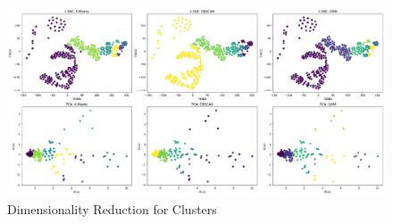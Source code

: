\documentclass[english]{article}
\begin{document}
\vspace{1cm}

\begin{figure}[h]
    \centering
    \includegraphics[width=1\textwidth]{img/dimensionality_reduction.png}
        \vspace{-2mm}
    \caption{Dimensionality Reduction for Clusters}
\end{figure}
\end{document}
